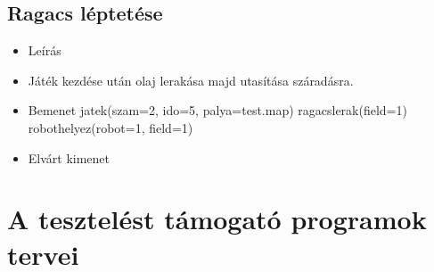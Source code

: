 \subsection{Ragacs léptetése}
\begin{itemize}
	\item Leírás\newline
	\item Játék kezdése után olaj lerakása majd utasítása száradásra.
	\item Bemenet\newline
		jatek(szam=2, ido=5, palya=test.map) \newline
		ragacslerak(field=1) \newline
		robothelyez(robot=1, field=1) \newline
						
	\item Elvárt kimenet\newline
\end{itemize}



\section{A tesztelést támogató programok tervei}

